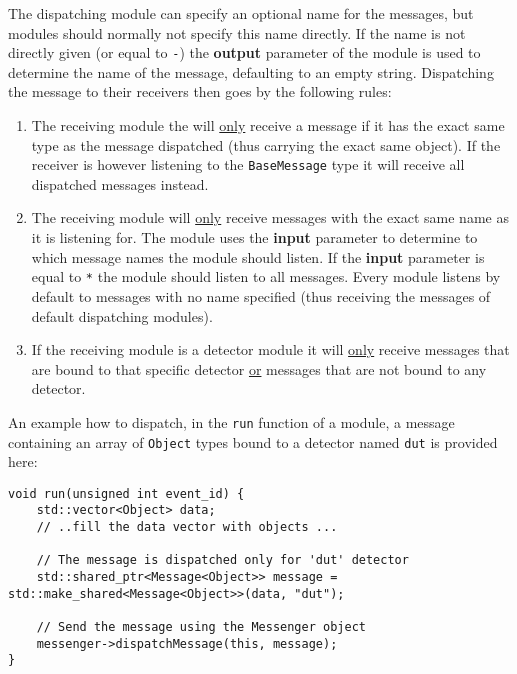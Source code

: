 The dispatching module can specify an optional name for the messages, but modules should normally not specify this name directly.
If the name is not directly given (or equal to \texttt{-}) the \textbf{output} parameter of the module is used to determine the name of the message, defaulting to an empty string.
Dispatching the message to their receivers then goes by the following rules:
\begin{enumerate}
\item The receiving module the will \underline{only} receive a message if it has the exact same type as the message dispatched (thus carrying the exact same object).
If the receiver is however listening to the \texttt{BaseMessage} type it will receive all dispatched messages instead.
\item The receiving module will \underline{only} receive messages with the exact same name as it is listening for.
The module uses the \textbf{input} parameter to determine to which message names the module should listen.
If the \textbf{input} parameter is equal to \texttt{*} the module should listen to all messages.
Every module listens by default to messages with no name specified (thus receiving the messages of default dispatching modules).
\item If the receiving module is a detector module it will \underline{only} receive messages that are bound to that specific detector \underline{or} messages that are not bound to any detector.
\end{enumerate}

An example how to dispatch, in the \texttt{run} function of a module, a message containing an array of \texttt{Object} types bound to a detector named \texttt{dut} is provided here:
\begin{verbatim}
void run(unsigned int event_id) {
    std::vector<Object> data;
    // ..fill the data vector with objects ...

    // The message is dispatched only for 'dut' detector
    std::shared_ptr<Message<Object>> message = std::make_shared<Message<Object>>(data, "dut");

    // Send the message using the Messenger object
    messenger->dispatchMessage(this, message);
}
\end{verbatim}

